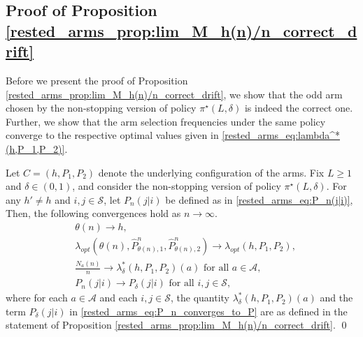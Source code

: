  \subsection{Proof of Proposition \ref{rested_arms_prop:lim_M_h(n)/n_correct_drift}}\label{rested_arms_appndx:proof_of_prop_lim_M_h(n)/n_correct_drift}
Before we present the proof of Proposition \ref{rested_arms_prop:lim_M_h(n)/n_correct_drift}, we show that the odd arm chosen by the non-stopping version of policy $\pi^{\star}(L,\delta)$ is indeed the correct one. Further, we show that the arm selection frequencies under the same policy converge to the respective optimal values given in \eqref{rested_arms_eq:lambda^*(h,P_1,P_2)}.
\begin{prop}
	Let $C=(h,P_1,P_2)$ denote the underlying configuration of the arms. Fix $L\geq 1$ and $\delta\in(0,1)$, and consider the non-stopping version of policy $\pi^{\star}(L,\delta)$. For any $h'\neq h$ and $i,j\in\mathcal{S}$, let $P_n(j|i)$ be defined as in \eqref{rested_arms_eq:P_n(j|i)}, Then, the following convergences hold  as $n\to\infty$.
	\begingroup\allowdisplaybreaks\begin{align}
	&\theta(n)\to h,\label{rested_arms_eq:h^*_converges_to_h}\\
	&\lambda_{opt}(\theta(n),\hat{P}^n_{\theta(n),1},\hat{P}^n_{\theta(n),2})\to\lambda_{opt}(h,P_1,P_2),\label{rested_arms_eq:lambda^*_converges_to_true_lambda^*_values}\\
	&\frac{N_a(n)}{n}\to \lambda^*_\delta(h,P_1,P_2)(a)\text{ for all }a\in\mathcal{A},\label{rested_arms_eq:arm_frequencies_converge}\\
	&P_{n}(j|i)\to P_\delta(j|i)\text{ for all }i,j\in\mathcal{S},\label{rested_arms_eq:P_n_converges_to_P}
	\end{align}\endgroup
where for each $a\in\mathcal{A}$ and each $i,j\in\mathcal{S}$, the quantity $\lambda_{\delta}^*(h,P_1,P_2)(a)$ and the term $P_\delta(j|i)$ in \eqref{rested_arms_eq:P_n_converges_to_P} are as defined in the statement of Proposition \ref{rested_arms_prop:lim_M_h(n)/n_correct_drift}.
\qed
\end{prop}
